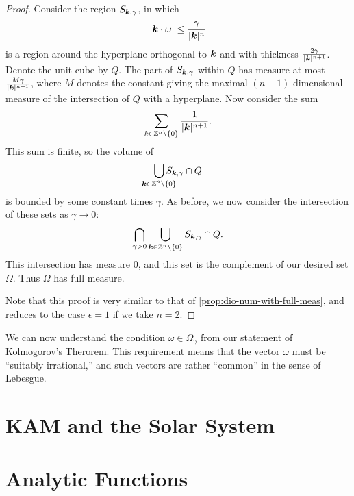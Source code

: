 \documentclass[twoside,letterpaper,10pt]{article}
\begin{document}
\begin{proof}
  Consider the region $S_{\bm{k}, \gamma}$, in which
  \begin{equation*}
    |\bm{k} \cdot \omega| \leq \frac{\gamma}{|\bm{k}|^n}
  \end{equation*}
  is a region around the hyperplane orthogonal to $\bm{k}$ and with thickness
  $\frac{2\gamma}{|\bm{k}|^{n+1}}$.
  Denote the unit cube by $Q$.
  The part of $S_{\bm{k}, \gamma}$ within $Q$ has measure at most
  $\frac{M\gamma}{|\bm{k}|^{n+1}}$, where $M$ denotes the constant giving the
  maximal $(n-1)$-dimensional measure of the intersection of $Q$ with a
  hyperplane.
  Now consider the sum
  \begin{equation*}
    \sum_{k \in \mathbb{Z}^n \setminus \{0\}} \frac{1}{|\bm{k}|^{n+1}}.
  \end{equation*}
  This sum is finite, so the volume of
  \begin{equation*}
    \bigcup_{\mathclap{\bp{k} \in \Z^n \setminus \{0\}}} S_{\bp{k}, \gamma} \cap Q
  \end{equation*}
  is bounded by some constant times $\gamma$.
  As before, we now consider the intersection of these sets as $\gamma \to 0$:
  \begin{equation*}
     \bigcap_{\gamma > 0} \bigcup_{\bm{k} \in \mathbb{Z}^n \setminus \{0\}} S_{\bm{k},
       \gamma} \cap Q.
   \end{equation*}
   This intersection has measure $0$, and this set is the complement of our
   desired set $\Omega$.
   Thus $\Omega$ has full measure.

  Note that this proof is very similar to that of
  \cref{prop:dio-num-with-full-meas}, and reduces to the case $\epsilon = 1$ if
  we take $n = 2$.
\end{proof}

We can now understand the condition $\omega \in \Omega_{\gamma}$ from our
statement of Kolmogorov's Therorem.
This requirement means that the vector $\omega$ must be ``suitably irrational,''
and such vectors are rather ``common'' in the sense of Lebesgue.


\section{KAM and the Solar System}
\label{sec:kam-solar-system}



\section{Analytic Functions}
\label{sec:analytic-functions}
\end{document}
